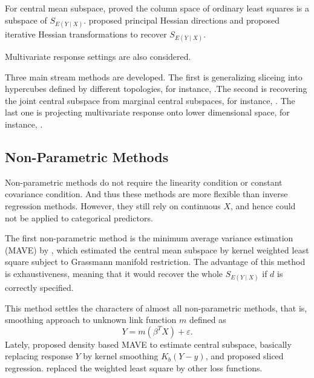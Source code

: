 For central mean subspace, \citet{li1989regression} proved the column
space of ordinary least squares is a subspace of $S_{E\left(Y\mid X\right)}$.
\citet{li1992principal} proposed principal Hessian directions and
\citet{cook2002dimension} proposed iterative Hessian transformations
to recover $S_{E\left(Y\mid X\right)}$. 

Multivariate response settings are also considered. %
\begin{comment}
add envelope and dr ask dr su 
\end{comment}
Three main stream methods are developed. The first is generalizing
sliceing into hypercubes defined by different topologies, for instance,
\citet{aragon1997gauss,hsing1999nearest,setodji2004k}.The second
is recovering the joint central subspace from marginal central subspaces,
for instance, \citet{cook2003model,saracco2005asymptotics,yin2006moment}.
The last one is projecting multivariate response onto lower dimensional
space, for instance, \citet{li2008projective,zhu2010dimension}. 


\subsection{Non-Parametric Methods}

Non-parametric methods do not require the linearity condition or constant
covariance condition. And thus these methods are more flexible than
inverse regression methods. However, they still rely on continuous
$X$, and hence could not be applied to categorical predictors.

The first non-parametric method is the minimum average variance estimation
(MAVE) by \citet{xia2002adaptive}, which estimated the central mean
subspace by kernel weighted least square subject to Grassmann manifold
restriction. The advantage of this method is exhaustiveness, meaning
that it would recover the whole $S_{E\left(Y\mid X\right)}$ if $d$
is correctly specified. %
\begin{comment}
add bayesian method khare
\end{comment}
This method settles the characters of almost all non-parametric methods,
that is, smoothing approach to unknown link function $m$ defined
as 
\[
Y=m\left(\beta^{T}X\right)+\varepsilon.
\]
Lately, \citet{xia2007constructive} proposed density based MAVE to
estimate central subspace, basically replacing response $Y$ by kernel
smoothing $K_{b}\left(Y-y\right)$, and \citet{wang2008sliced} proposed
sliced regression. \citet{hernandez2005dimension,yin2005direction,yin2008successive}
replaced the weighted least square by other loss functions.


